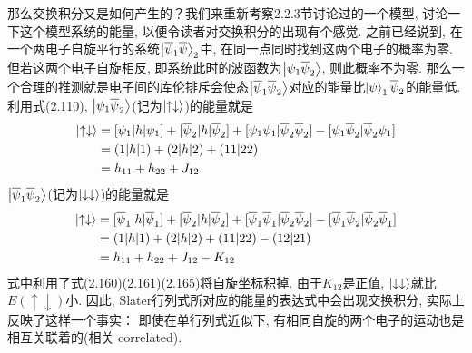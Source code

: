 
那么交换积分又是如何产生的？我们来重新考察2.2.3节讨论过的一个模型, 讨论一下这个模型系统的能量, 以便令读者对交换积分的出现有个感觉. 之前已经说到, 在一个两电子自旋平行的系统$\Ket{\overline{\psi}_1\overline{\psi}}_2$中, 在同一点同时找到这两个电子的概率为零. 但若这两个电子自旋相反, 即系统此时的波函数为$\Ket{{\psi}_1\overline{\psi}_2}$, 则此概率不为零. 那么一个合理的推测就是电子间的库伦排斥会使态$\Ket{\overline{\psi}_1\overline{\psi}_2}$对应的能量比$\Ket{\psi}_1\overline{\psi}_2$的能量低. 利用式(2.110), $\Ket{\psi_1\overline{\psi}_2}$(记为$\Ket{\uparrow\downarrow}$)的能量就是
\begin{align}
\Ket{\uparrow\downarrow} & =[\psi_1|h|\psi_1] + [\overline{\psi}_2|h|\overline{\psi}_2] + [\psi_1\psi_1|\overline{\psi}_2\overline{\psi}_2] - [\psi_1\overline{\psi}_2|\overline{\psi}_2\psi_1]\notag\\
& = (1|h|1) + (2|h|2) + (11|22)\notag\\
& = h_{11} + h_{22} + J_{12}
\end{align}
$\Ket{\overline{\psi}_1\overline{\psi}_2}$(记为$\Ket{\downarrow\downarrow}$)的能量就是
\begin{align}
\Ket{\uparrow\downarrow} & =[\overline{\psi}_1|h|\overline{\psi}_1] + [\overline{\psi}_2|h|\overline{\psi}_2] + [\overline{\psi}_1\overline{\psi}_1|\overline{\psi}_2\overline{\psi}_2] - [\overline{\psi}_1\overline{\psi}_2|\overline{\psi}_2\overline{\psi}_1]\notag\\
& = (1|h|1) + (2|h|2) + (11|22) - (12|21)\notag\\
& = h_{11} + h_{22} + J_{12} - K_{12}
\end{align}
式中利用了式(2.160)(2.161)(2.165)将自旋坐标积掉. 由于$K_{12}$是正值, $\Ket{\downarrow\downarrow}$就比$E(\uparrow\downarrow)$小. 因此, Slater行列式所对应的能量的表达式中会出现交换积分, 实际上反映了这样一个事实： 即使在单行列式近似下, 有相同自旋的两个电子的运动也是相互关联着的(相关 correlated).
